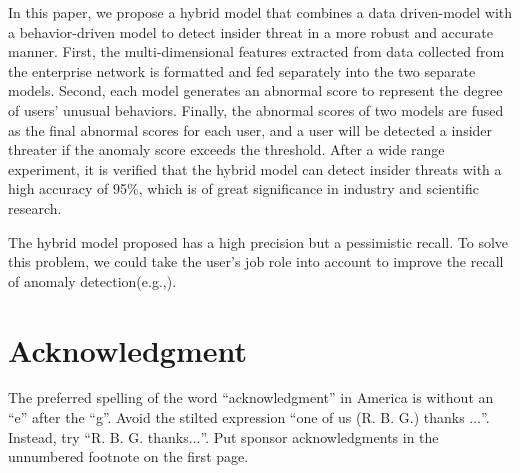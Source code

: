 \documentclass[conference]{IEEEtran}
\begin{document}
In this paper, we propose a hybrid model that combines a data driven-model with a behavior-driven model to detect insider threat in a more robust and accurate manner. 
First, the multi-dimensional features extracted from data collected  from the enterprise network is formatted and fed separately into the two separate models. Second, each model generates an abnormal score to represent the degree of users' unusual behaviors. Finally, the abnormal scores of two models are fused as the final abnormal scores for each user, and a user will be detected a insider threater if the anomaly score exceeds the threshold. After a wide range experiment, it is 
verified that the hybrid model can detect insider threats with a high accuracy of 95\%, which is of great significance in industry and scientific research.

The hybrid model proposed has a high precision but a pessimistic recall. To solve this problem, we could take the user’s job role into account to improve the recall of anomaly detection(e.g.,\cite{b16}).   	



\section*{Acknowledgment}

The preferred spelling of the word ``acknowledgment'' in America is without 
an ``e'' after the ``g''. Avoid the stilted expression ``one of us (R. B. 
G.) thanks $\ldots$''. Instead, try ``R. B. G. thanks$\ldots$''. Put sponsor 
acknowledgments in the unnumbered footnote on the first page.
\end{document}
